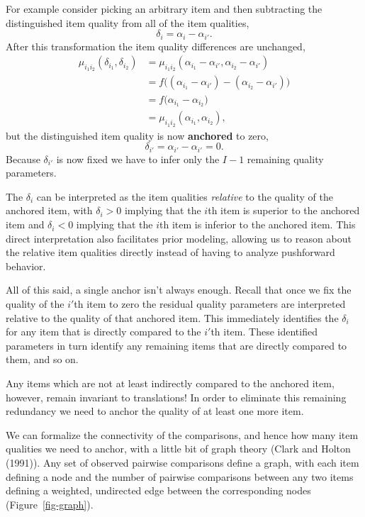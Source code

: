 \documentclass[
  letterpaper,
  DIV=11,
  numbers=noendperiod]{scrartcl}
\begin{document}
For example consider picking an arbitrary item and then subtracting the
distinguished item quality from all of the item qualities, \[
\delta_{i} = \alpha_{i} - \alpha_{i'}.
\] After this transformation the item quality differences are unchanged,
\begin{align*}
\mu_{i_{1} i_{2}}( \delta_{i_{1}}, \delta_{i_{2}} )
&=
\mu_{i_{1} i_{2}}( \alpha_{i_{1}} - \alpha_{i'},
                   \alpha_{i_{2}} - \alpha_{i'} )
\\
&=
f \big(  (\alpha_{i_{1}} - \alpha_{i'})
       - (\alpha_{i_{2}} - \alpha_{i'}) \big)
\\
&=
f \big( \alpha_{i_{1}} - \alpha_{i_{2}} \big)
\\
&=
\mu_{i_{1} i_{2}}( \alpha_{i_{1}}, \alpha_{i_{2}} ),
\end{align*} but the distinguished item quality is now \textbf{anchored}
to zero, \[
\delta_{i'} = \alpha_{i'} - \alpha_{i'} = 0.
\] Because \(\delta_{i'}\) is now fixed we have to infer only the
\(I - 1\) remaining quality parameters.

The \(\delta_{i}\) can be interpreted as the item qualities
\emph{relative} to the quality of the anchored item, with
\(\delta_{i} > 0\) implying that the \(i\)th item is superior to the
anchored item and \(\delta_{i} < 0\) implying that the \(i\)th item is
inferior to the anchored item. This direct interpretation also
facilitates prior modeling, allowing us to reason about the relative
item qualities directly instead of having to analyze pushforward
behavior.

All of this said, a single anchor isn't always enough. Recall that once
we fix the quality of the \(i'\)th item to zero the residual quality
parameters are interpreted relative to the quality of that anchored
item. This immediately identifies the \(\delta_{i}\) for any item that
is directly compared to the \(i'\)th item. These identified parameters
in turn identify any remaining items that are directly compared to them,
and so on.

Any items which are not at least indirectly compared to the anchored
item, however, remain invariant to translations! In order to eliminate
this remaining redundancy we need to anchor the quality of at least one
more item.

We can formalize the connectivity of the comparisons, and hence how many
item qualities we need to anchor, with a little bit of graph theory
(Clark and Holton (1991)). Any set of observed pairwise comparisons
define a graph, with each item defining a node and the number of
pairwise comparisons between any two items defining a weighted,
undirected edge between the corresponding nodes
(Figure~\ref{fig-graph}).
\end{document}
